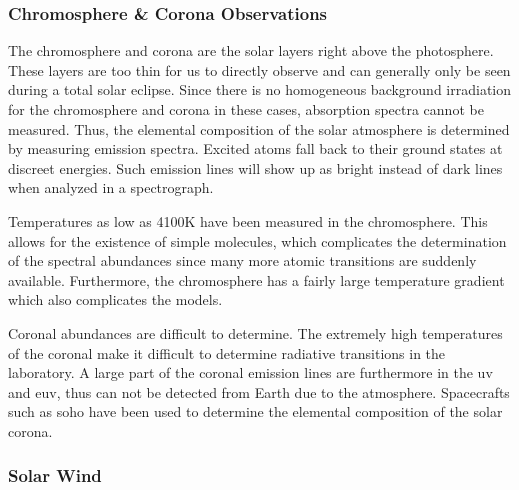 \subsubsection{Chromosphere \& Corona Observations}

The chromosphere and corona are the solar layers right above the photosphere. These layers are too thin for us to directly observe and can generally only be seen during a total solar eclipse. Since there is no homogeneous background irradiation for the chromosphere and corona in these cases, absorption spectra cannot be measured. Thus, the elemental composition of the solar atmosphere is determined by measuring emission spectra. Excited atoms fall back to their ground states at discreet energies. Such emission lines will show up as bright instead of dark lines when analyzed in a spectrograph. 

Temperatures as low as 4100K have been measured in the chromosphere. This allows for the existence of simple molecules, which complicates the determination of the spectral abundances since many more atomic transitions are suddenly available. Furthermore, the chromosphere has a fairly large temperature gradient which also complicates the models. 

Coronal abundances are difficult to determine. The extremely high temperatures of the coronal make it difficult to determine radiative transitions in the laboratory. A large part of the coronal emission lines are furthermore in the \ac{uv} and \ac{euv}, thus can not be detected from Earth due to the atmosphere. Spacecrafts such as \ac{soho} have been used to determine the elemental composition of the solar corona.



\subsubsection{Solar Wind \label{sec:solar_abus:solar_wind}}

